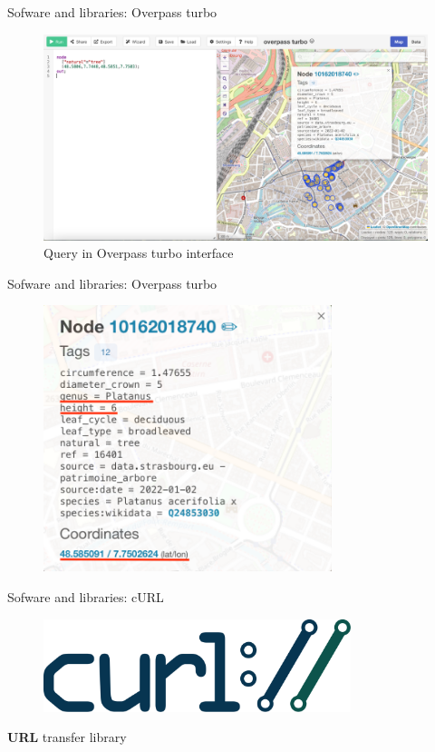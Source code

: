 \documentclass[10pt]{beamer}
\begin{document}
\begin{frame}{Sofware and libraries: Overpass turbo}
    \begin{figure}[H]
      \centering
      \includegraphics[width=\textwidth]{images/overpass-turbo.png}
      \caption{Query in Overpass turbo interface}
    \end{figure}
\end{frame}

\begin{frame}{Sofware and libraries: Overpass turbo}
  \begin{figure}[H]
    \centering
    \includegraphics[width=0.75\textwidth]{images/ovt-node.png}
  \end{figure}
\end{frame}

\begin{frame}{Sofware and libraries: cURL}
  \Large
  \begin{figure}[H]
      \centering
      \includegraphics[width=0.8\textwidth]{images/Curl-logo.svg.png}
  \end{figure}
  \begin{center}
    \Large \textbf{URL} transfer library
  \end{center}
\end{frame}
\end{document}
